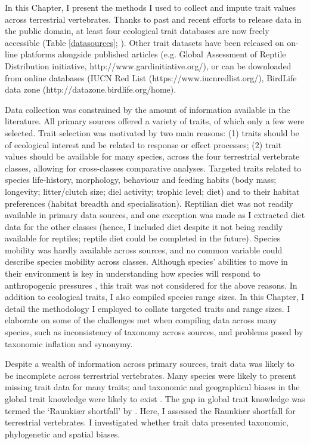 In this Chapter, I present the methods I used to collect and impute trait values across terrestrial vertebrates. Thanks to past and recent efforts to release data in the public domain, at least four ecological trait databases are now freely accessible (Table \ref{datasources}; \citet{Cooke2019}). Other trait datasets have been released on on-line platforms alongside published articles (e.g. Global Assessment of Reptile Distribution initiative, http://www.gardinitiative.org/), or can be downloaded from online databases (IUCN Red List (https://www.iucnredlist.org/), BirdLife data zone (http://datazone.birdlife.org/home). 

Data collection was constrained by the amount of information available in the literature.  All  primary sources offered a variety of traits, of which only a few were selected. Trait selection was motivated by two main reasons: (1) traits should be of ecological interest and be related to response or effect processes; (2) trait values should be available for many species, across the four terrestrial vertebrate classes, allowing for cross-classes comparative analyses. Targeted traits related to species life-history, morphology, behaviour and feeding habits (body mass; longevity; litter/clutch size; diel activity; trophic level; diet) and to their habitat preferences (habitat breadth and specialisation). Reptilian diet was not readily available in primary data sources, and one exception was made as I extracted diet data for the other classes (hence, I included diet despite it not being readily available for reptiles; reptile diet could be completed in the future). Species mobility was hardly available across sources, and no common variable could describe species mobility across classes. Although species' abilities to move in their environment is key in understanding how species will respond to anthropogenic pressures \citep{Schloss2012, Barbet-Massin2012,Pearson2006}, this trait was not considered for the above reasons. In addition to ecological traits, I also compiled species range sizes. In this Chapter, I detail the methodology I employed to collate targeted traits and range sizes. I elaborate on some of the challenges met when compiling data across many species, such as inconsistency of taxonomy across sources, and problems posed by taxonomic inflation and synonymy.

Despite a wealth of information across primary sources, trait data was likely to be incomplete across terrestrial vertebrates. Many species were likely to present missing trait data for many traits; and taxonomic and geographical biases in the global trait knowledge were likely to exist \citep{Hortal2014, Gonzalez-Suarez2012}. The gap in global trait knowledge was termed the `Raunki{\ae}r shortfall' by \citet{Hortal2014}. Here, I assessed the Raunki{\ae}r shortfall for terrestrial vertebrates. I investigated whether trait data presented taxonomic, phylogenetic and spatial biases.  

